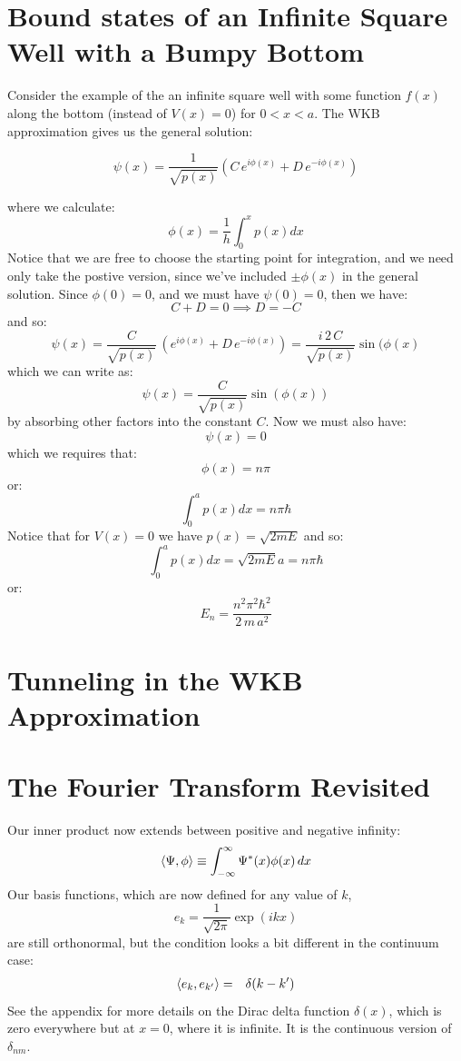\documentclass[12pt]{book}
\begin{document}
\section{Bound states of an Infinite Square Well with a Bumpy Bottom}

Consider the example of the an infinite square well with some function $f(x)$ along the bottom (instead of $V(x)=0$) for $0 < x < a$.  The WKB approximation gives us the general solution:

$$\psi(x)=\frac{1}{\sqrt{p(x)}}\left(C\,e^{\displaystyle i\phi(x)} 
+ D\,e^{\displaystyle -i\phi(x)}\right)$$

where we calculate:
$$\phi(x) = \frac{1}{h}\int_0^x p(x) dx$$
Notice that we are free to choose the starting point for integration, and we need only take the postive version, since we've included $\pm\phi(x)$ in the general solution. 
Since $\phi(0)=0$, and we must have $\psi(0)=0$, then we have:
$$C+D=0 \implies D = -C$$
and so:
$$\psi(x) = \frac{C}{\sqrt{p(x)}}\,\left(e^{\displaystyle i\phi(x)} 
+ D\,e^{\displaystyle -i\phi(x)}\right)
= \frac{i\,2\,C}{\sqrt{p(x)}}\sin(\phi(x)
$$
which we can write as:
$$\psi(x) = \frac{C}{\sqrt{p(x)}}\sin(\phi(x))$$
by absorbing other factors into the constant $C$.  Now we must also have:
$$\psi(x)=0$$
which we requires that:
$$\phi(x) = n\pi$$
or:
$$\int_0^a p(x) dx = n\pi \hbar$$
Notice that for $V(x)=0$ we have $p(x) = \sqrt{2mE}$ and so:
$$\int_0^a p(x) dx = \sqrt{2mE}a = n \pi \hbar$$
or:
$$E_n = \frac{n^2 \pi^2 \hbar^2}{2\,m\,a^2}$$











\section{Tunneling in the WKB Approximation }


\section{The Fourier Transform Revisited}

Our inner product now extends between positive and negative infinity:
\begin{equation}
\braket{\Psi, \phi} \equiv \int_{-\infty}^{\infty} \Psi^*(x) \phi(x) \, dx
\end{equation}
Our basis functions, which are now defined for any value of $k$,
\begin{equation}
e_k = \frac{1}{\sqrt{2\pi}} \exp(i k x)
\end{equation}
are still orthonormal, but the condition looks a bit different in the continuum case:
\begin{eqnarray*}
\braket{e_k, e_{k'}} &=& \delta(k-k')
\end{eqnarray*}
See the appendix for more details on the Dirac delta function $\delta(x)$, which is zero everywhere but at $x=0$, where it is infinite.  It is the continuous version of $\delta_{nm}$.
\end{document}
